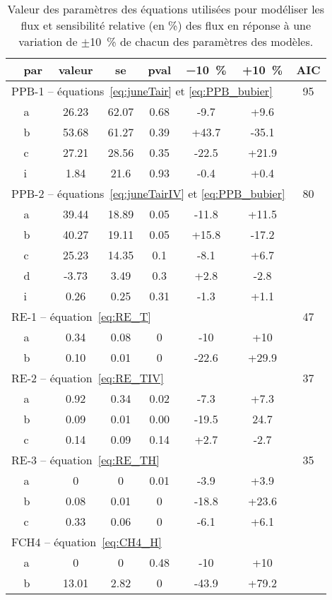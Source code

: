 \begin{table}
\centering
\caption{Valeur des paramètres des équations utilisées pour modéliser les flux et sensibilité relative (en \%) des flux en réponse à une variation de $\pm$\SI{10}{\percent} de chacun des paramètres des modèles.}
\label{table:mdl_par}
\begin{tabular}{llcccccc}\toprule

& par & valeur & se & pval & \SI{-10}{\percent} & +\SI{+10}{\percent} & AIC \\ \midrule
\multicolumn{7}{l}{PPB-1 -- équations~\ref{eq:juneTair} et \ref{eq:PPB_bubier}} & 95 \\ [+.5ex]
& a & 26.23 & 62.07 & 0.68 & -9.7 & +9.6 & \\
& b & 53.68 & 61.27 & 0.39 & +43.7 &-35.1 & \\
& c & 27.21 & 28.56 & 0.35 &-22.5 & +21.9 & \\
& i &  1.84 & 21.6  & 0.93 & -0.4 &  +0.4 & \\[+1ex]
\multicolumn{7}{l}{PPB-2 -- équations~\ref{eq:juneTairIV} et \ref{eq:PPB_bubier}} & 80 \\ [+.5ex]
& a & 39.44 & 18.89 & 0.05 & -11.8 & +11.5 &\\
& b & 40.27 & 19.11 & 0.05 & +15.8 & -17.2 &\\
& c & 25.23 & 14.35 & 0.1 & -8.1 & +6.7 &\\
& d & -3.73 & 3.49 & 0.3 & +2.8 & -2.8 &\\
& i &  0.26 & 0.25 & 0.31 & -1.3 & +1.1 &\\[+1ex]
\multicolumn{7}{l}{RE-1 -- équation~\ref{eq:RE_T}} & 47 \\ [+.5ex]
& a & 0.34 & 0.08 & 0 & -10 & +10 &\\
& b & 0.10 & 0.01 & 0 & -22.6 & +29.9 &\\[+1ex]
\multicolumn{7}{l}{RE-2 -- équation~\ref{eq:RE_TIV}} & 37 \\ [+.5ex]
& a & 0.92 & 0.34 & 0.02 & -7.3 & +7.3 &\\
& b & 0.09 & 0.01 & 0.00 & -19.5 & 24.7 &\\
& c & 0.14 & 0.09 & 0.14 & +2.7 & -2.7  &\\[+1ex]
\multicolumn{7}{l}{RE-3 -- équation~\ref{eq:RE_TH}} & 35  \\ [+.5ex]
& a & 0 & 0 & 0.01 & -3.9 & +3.9 &\\
& b & 0.08 & 0.01 & 0 & -18.8 & +23.6 &\\
& c & 0.33 & 0.06 & 0 & -6.1 & +6.1 &\\[+1ex]
\multicolumn{7}{l}{FCH4 -- équation~\ref{eq:CH4_H}}  &\\ [+.5ex]
& a & 0 & 0 & 0.48 & -10 & +10 &\\
& b & 13.01 & 2.82 & 0 & -43.9 & +79.2 & \\[+1ex]
\bottomrule
\end{tabular}
\end{table}

